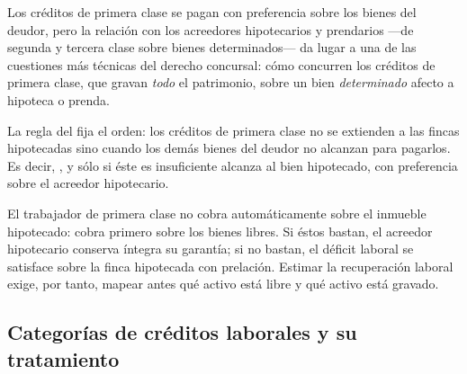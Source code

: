 Los créditos de primera clase se pagan con preferencia sobre los bienes del deudor, pero
la relación con los acreedores hipotecarios y prendarios ---de segunda y tercera clase
sobre bienes determinados--- da lugar a una de las cuestiones más técnicas del derecho
concursal: cómo concurren los créditos de primera clase, que gravan \emph{todo} el
patrimonio, sobre un bien \emph{determinado} afecto a hipoteca o prenda.

La regla del  fija el orden: los créditos de primera clase no se extienden a
las fincas hipotecadas sino cuando los demás bienes del deudor no alcanzan para pagarlos.
Es decir, , y sólo si
éste es insuficiente alcanza al bien hipotecado, con preferencia sobre el acreedor
hipotecario.

\begin{foco}
El trabajador de primera clase no cobra automáticamente sobre el inmueble hipotecado: cobra
primero sobre los bienes libres. Si éstos bastan, el acreedor hipotecario conserva íntegra su
garantía; si no bastan, el déficit laboral se satisface sobre la finca hipotecada con
prelación. Estimar la recuperación laboral exige, por tanto, mapear antes qué activo está
libre y qué activo está gravado.
\end{foco}

\bloqueNormativo

\subsection{Categorías de créditos laborales y su tratamiento}

